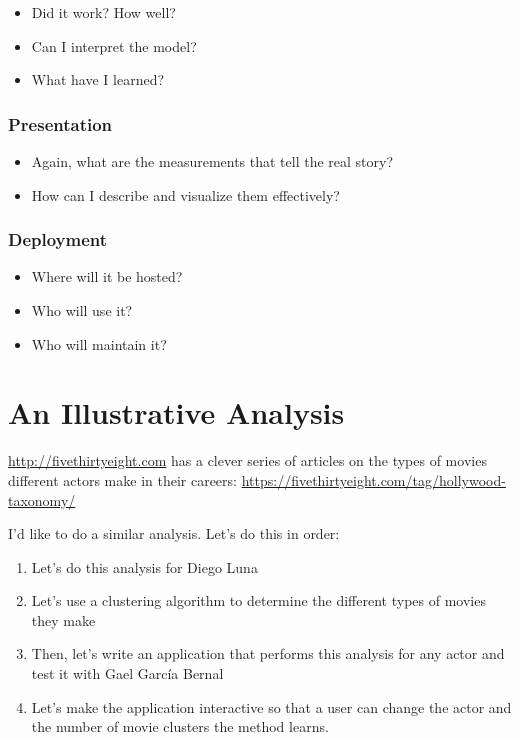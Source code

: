 \documentclass[12pt,]{book}
\providecommand{\tightlist}{%
  \setlength{\itemsep}{0pt}\setlength{\parskip}{0pt}}
\theoremstyle{definition}
\theoremstyle{definition}
\theoremstyle{definition}
\theoremstyle{remark}
\begin{document}
\begin{itemize}
\tightlist
\item
  Did it work? How well?
\item
  Can I interpret the model?
\item
  What have I learned?
\end{itemize}

\subsection{Presentation}\label{presentation}

\begin{itemize}
\tightlist
\item
  Again, what are the measurements that tell the real story?
\item
  How can I describe and visualize them effectively?
\end{itemize}

\subsection{Deployment}\label{deployment}

\begin{itemize}
\tightlist
\item
  Where will it be hosted?
\item
  Who will use it?
\item
  Who will maintain it?
\end{itemize}

\chapter{An Illustrative Analysis}\label{an-illustrative-analysis}

\url{http://fivethirtyeight.com} has a clever series of articles on the
types of movies different actors make in their careers:
\url{https://fivethirtyeight.com/tag/hollywood-taxonomy/}

I'd like to do a similar analysis. Let's do this in order:

\begin{enumerate}
\def\labelenumi{\arabic{enumi})}
\tightlist
\item
  Let's do this analysis for Diego Luna
\item
  Let's use a clustering algorithm to determine the different types of
  movies they make
\item
  Then, let's write an application that performs this analysis for any
  actor and test it with Gael García Bernal
\item
  Let's make the application interactive so that a user can change the
  actor and the number of movie clusters the method learns.
\end{enumerate}
\end{document}
